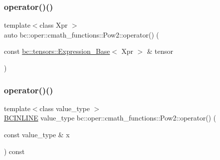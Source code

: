 \mbox{\label{structbc_1_1oper_1_1cmath__functions_1_1Pow2_a42f2394b4de854c51f0eb0aa5b8fdaa7}} 
\subsubsection{\texorpdfstring{operator()()}{operator()()}\hspace{0.1cm}{\footnotesize\ttfamily [2/3]}}
{\footnotesize\ttfamily template$<$class Xpr $>$ \\
auto bc\+::oper\+::cmath\+\_\+functions\+::\+Pow2\+::operator() (\begin{DoxyParamCaption}\item[{const \hyperlink{classbc_1_1tensors_1_1Expression__Base}{bc\+::tensors\+::\+Expression\+\_\+\+Base}$<$ Xpr $>$ \&}]{tensor }\end{DoxyParamCaption})\hspace{0.3cm}{\ttfamily [inline]}}

\mbox{\label{structbc_1_1oper_1_1cmath__functions_1_1Pow2_a8a8192d1d6dc40f9bdc9cbb02c1c8578}} 
\subsubsection{\texorpdfstring{operator()()}{operator()()}\hspace{0.1cm}{\footnotesize\ttfamily [3/3]}}
{\footnotesize\ttfamily template$<$class value\+\_\+type $>$ \\
\hyperlink{common_8h_a6699e8b0449da5c0fafb878e59c1d4b1}{B\+C\+I\+N\+L\+I\+NE} value\+\_\+type bc\+::oper\+::cmath\+\_\+functions\+::\+Pow2\+::operator() (\begin{DoxyParamCaption}\item[{const value\+\_\+type \&}]{x }\end{DoxyParamCaption}) const\hspace{0.3cm}{\ttfamily [inline]}}



